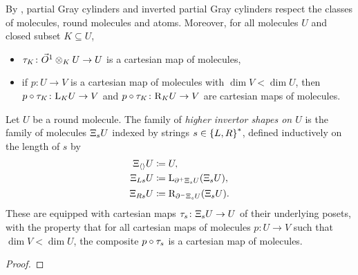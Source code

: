 \begin{rmk} \label{rmk:inverted_cylinder_well_def}
	By \cite[Lemma 1.20, Lemma 1.26]{chanavat2024equivalences}, partial Gray cylinders and inverted partial Gray cylinders respect the classes of molecules, round molecules and atoms.
	Moreover, for all molecules \( U \) and closed subset \( K \subseteq U \),
	\begin{itemize}
		\item \( \tau_K \colon \vec{O}^{1} \otimes_K U \to U \) is a cartesian map of molecules,
		\item if \( p \colon U \to V \) is a cartesian map of molecules with \( \dim V < \dim U \), then \( p \circ \tau_K \colon \mathrm{L}_{K}{U} \to V \) and \( p \circ \tau_K \colon \mathrm{R}_{K}{U} \to V \) are cartesian maps of molecules.
	\end{itemize}
\end{rmk}

\begin{dfn} 
    Let \( U \) be a round molecule.
    The family of \emph{higher invertor shapes on \( U \)} is the family of molecules \( \Xi_{s} U \) indexed by strings \( s \in \left\{ {L, R} \right\}^* \), defined inductively on the length of \( s \) by
    \begin{align*}
        \Xi_{\langle\rangle} U & \coloneqq U, \\
        \Xi_{Ls} U &\coloneqq \mathrm{L}_{\partial_{}^{+} \Xi_{s} U} (\Xi_{s} U), \\
                \Xi_{Rs} U &\coloneqq \mathrm{R}_{\partial_{}^{-} \Xi_{s} U} (\Xi_{s} U).
    \end{align*}
	These are equipped with cartesian maps \( \tau_s \colon \Xi_{s} U \to U \) of their underlying posets, with the property that for all cartesian maps of molecules \( p \colon U \to V \) such that \( \dim V < \dim U \), the composite \( p \circ \tau_s \) is a cartesian map of molecules.
\end{dfn}

\begin{lem} \label{lem:subdivision_of_invertors}
\end{lem}
\begin{proof}
\end{proof}

